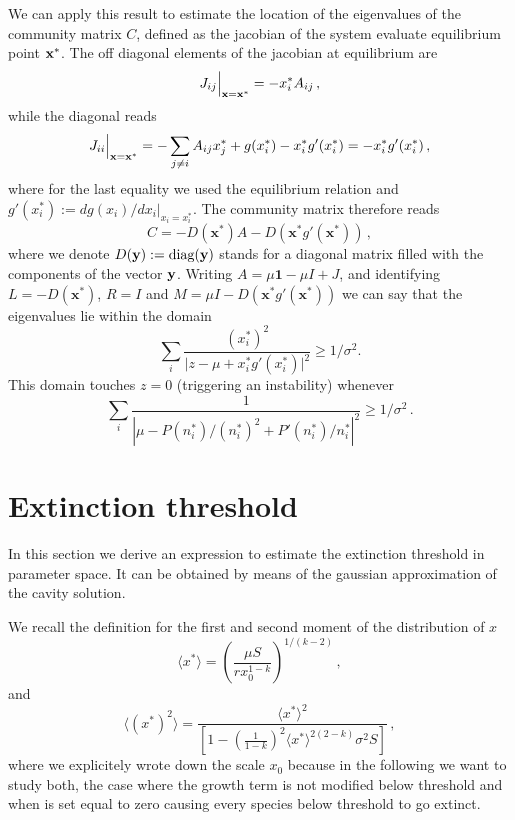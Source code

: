 \documentclass[10pt]{article}
\begin{document}
We can apply this result to estimate the location of the eigenvalues 
of the community matrix $C$, defined as the jacobian of the system
evaluate equilibrium point $\bf{x}^*$.
The off diagonal elements of the jacobian at equilibrium are
\begin{equation}
    J_{ij}\Big{|}_{\bf{x}=\bf{x}^*} = -x_i^*A_{ij} \, ,
\end{equation}
while the diagonal reads
\begin{equation}
    J_{ii}\Big{|}_{\bf{x}=\bf{x}^*} = -\sum_{j\neq i}A_{ij}x_j^* + g(x_i^*)-x_i^*g'(x_i^*) 
    = -x_i^*g'(x_i^*) \, ,
\end{equation}
where for the last equality we used the equilibrium relation and $g'(x_i^*):=d g(x_i)/dx_i|_{x_i=x_i^*}$.
The community matrix therefore reads
\begin{equation}
    C = -D(\mathbf x^*)A - D(\mathbf x^*g'(\mathbf x^*)) \, ,
\end{equation}
where we denote $D(\bf{y}):=\textrm{diag}(\bf{y})$ stands for a diagonal matrix
filled with the components of the vector $\bf{y}$.
Writing $A = \mu \mathbf{1} - \mu I + J$, and identifying 
$L = -D(\mathbf x^*)$, $R = I$ and $M = \mu I -  D(\mathbf x^*g'(\mathbf x^*))$
we can say that the eigenvalues lie within the domain
\begin{equation}
\sum_{i} \frac{(x_i^*)^2}{\vert z -\mu + x_i^*g'(x_i^*)\vert ^2}\geq 1/\sigma^2. 
\end{equation} 
This domain touches $z = 0$ (triggering an instability) whenever
\begin{equation}
    \sum_i \frac{1}{|\mu -P(n_i^*)/(n_i^*)^2+P'(n_i^*)/n_i^*|^2}\geq 1/\sigma^2 \, .
\end{equation}

\section{Extinction threshold}
In this section we derive an expression to estimate the 
extinction threshold in parameter space. 
It can be obtained by means of the gaussian
approximation of the cavity solution.

We recall the definition for the first and
second moment of the distribution of $x$
\begin{equation}
    \langle x^* \rangle = \left(\frac{ \mu S}{rx_0^{1-k}}\right)^{1/(k-2)} \, ,
\end{equation}
and
\begin{equation}
    \langle (x^*)^2 \rangle = \frac{ \langle x^* \rangle^2}
    {\left[1-\left(\frac{1}{1-k}\right)^2\langle x^* \rangle^{2(2-k)}
    \sigma^2S\right]} \, ,
\end{equation}
where we explicitely wrote down the scale $x_0$ because
in the following we want to study both, the case
where the growth term is not modified below threshold
and when is set equal to zero causing every species below threshold
to go extinct.
\end{document}
